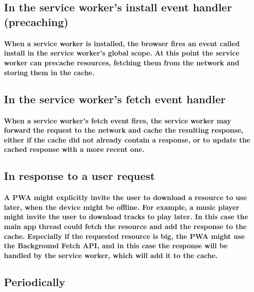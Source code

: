 \documentclass[12pt,a4paper]{article}
\begin{document}
    \subsection{In the service worker's install event handler (precaching)}

    \paragraph{When a service worker is installed, the browser fires an event called install in the service worker's global scope. At this point the service worker can precache resources, fetching them from the network and storing them in the cache. }
    
    \subsection{In the service worker's fetch event handler}

    \paragraph{When a service worker's fetch event fires, the service worker may forward the request to the network and cache the resulting response, either if the cache did not already contain a response, or to update the cached response with a more recent one.}
    
    \subsection{In response to a user request}

    \paragraph{A PWA might explicitly invite the user to download a resource to use later, when the device might be offline. For example, a music player might invite the user to download tracks to play later. In this case the main app thread could fetch the resource and add the response to the cache. Especially if the requested resource is big, the PWA might use the Background Fetch API, and in this case the response will be handled by the service worker, which will add it to the cache.}
    
    \subsection{Periodically}
\end{document}
